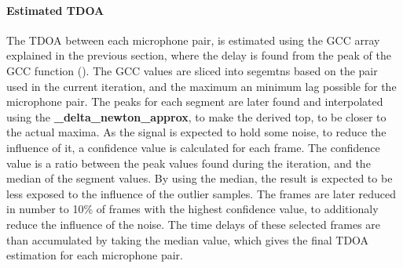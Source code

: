     \paragraph{Estimated TDOA}
    The TDOA between each microphone pair, is estimated using the GCC array explained in the previous section, where the delay is found from the peak of the GCC function (\cite{kwon2010gccphat}). The GCC values are sliced into segemtns based on the pair used in the current iteration, and the maximum an minimum lag possible for the microphone pair. The peaks for each segment are later found and interpolated using the \textbf{\_delta\_newton\_approx}, to make the derived top, to be closer to the actual maxima.
    As the signal is expected to hold some noise, to reduce the influence of it, a confidence value is calculated for each frame. The confidence value is a ratio between the peak values found during the iteration, and the median of the segment values. By using the median, the result is expected to be less exposed to the influence of the outlier samples. The frames are later reduced in number to 10\% of frames with the highest confidence value, to additionaly reduce the influence of the noise. The time delays of these selected frames are than accumulated by taking the median value, which gives the final TDOA estimation for each microphone pair. 
    
